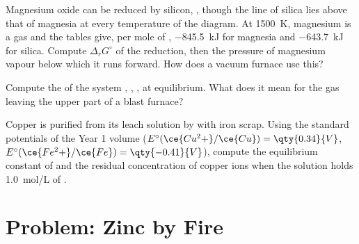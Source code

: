 \begin{exercise}[$\star\star\star$]\label{exo:b2:ellingham:10}
Magnesium oxide can be reduced by silicon, , though
the line of silica lies above that of magnesia at every temperature of the
diagram. At \qty{1500}{K}, magnesium is a gas and the tables give, per mole of
, \qty{-845.5}{kJ} for magnesia and \qty{-643.7}{kJ} for silica.
Compute $\Delta_r G^\circ$ of the reduction, then the pressure of magnesium
vapour below which it runs forward. How does a vacuum furnace use this?
\end{exercise}

\begin{exercise}[$\star\star\star$]\label{exo:b2:ellingham:11}
Compute the  of the system , , ,
 at equilibrium. What does it mean for the gas leaving the upper part
of a blast furnace?
\end{exercise}

\begin{exercise}[$\star\star\star$]\label{exo:b2:ellingham:12}
Copper is purified from its leach solution by  with iron scrap.
Using the standard potentials of the Year 1 volume ($E^\circ(\ce{Cu^2+}/\ce{Cu})
= \qty{0.34}{V}$, $E^\circ(\ce{Fe^2+}/\ce{Fe}) = \qty{-0.41}{V}$), compute the
equilibrium constant of  and the residual
concentration of copper ions when the solution holds \qty{1.0}{mol/L} of
.
\end{exercise}

\section{Problem: Zinc by Fire}

